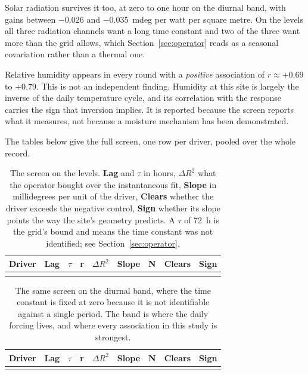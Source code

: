 \documentclass[11pt,a4paper]{article}
\begin{document}
Solar radiation survives it too, at zero to one hour on the diurnal band, with
gains between $-0.026$ and $-0.035$~mdeg per watt per square metre. On the
levels all three radiation channels want a long time constant and two of the
three want more than the grid allows, which Section~\ref{sec:operator} reads as
a seasonal covariation rather than a thermal one.

Relative humidity appears in every round with a \emph{positive} association of
$r \approx +0.69$ to $+0.79$. This is not an independent finding. Humidity at
this site is largely the inverse of the daily temperature cycle, and its
correlation with the response carries the sign that inversion implies. It is
reported because the screen reports what it measures, not because a
moisture mechanism has been demonstrated.

The tables below give the full screen, one row per driver, pooled over the whole
record.

\begin{table}[H]
\centering
\small
\begin{tabular}{lrrrrrrll}
\toprule
\textbf{Driver} & \textbf{Lag} & \textbf{$\tau$} & \textbf{r} &
\textbf{$\Delta R^2$} & \textbf{Slope} & \textbf{N} & \textbf{Clears} &
\textbf{Sign} \\
\midrule
\\
\bottomrule
\end{tabular}
\caption{The screen on the levels. \textbf{Lag} and \textbf{$\tau$} in hours,
\textbf{$\Delta R^2$} what the operator bought over the instantaneous fit,
\textbf{Slope} in millidegrees per unit of the driver, \textbf{Clears} whether
the driver exceeds the negative control, \textbf{Sign} whether its slope points
the way the site's geometry predicts. A $\tau$ of 72~h is the grid's bound and
means the time constant was not identified; see Section~\ref{sec:operator}.}
\label{tab:level}
\end{table}

\begin{table}[H]
\centering
\small
\begin{tabular}{lrrrrrrll}
\toprule
\textbf{Driver} & \textbf{Lag} & \textbf{$\tau$} & \textbf{r} &
\textbf{$\Delta R^2$} & \textbf{Slope} & \textbf{N} & \textbf{Clears} &
\textbf{Sign} \\
\midrule
\\
\bottomrule
\end{tabular}
\caption{The same screen on the diurnal band, where the time constant is fixed
at zero because it is not identifiable against a single period. The band is
where the daily forcing lives, and where every association in this study is
strongest.}
\label{tab:diurnal}
\end{table}
\end{document}
